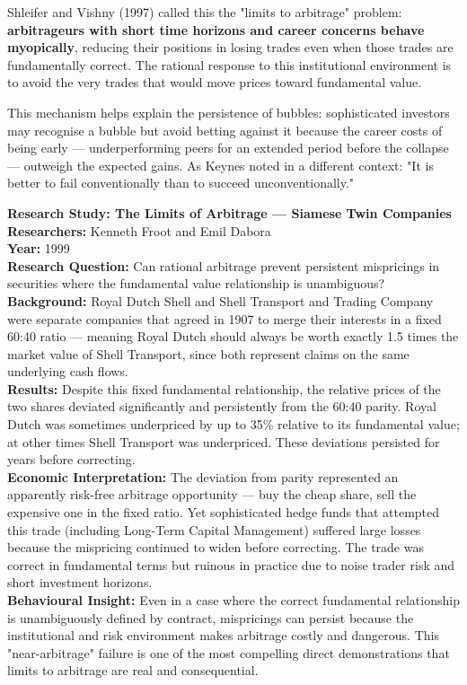 \documentclass[12pt, letterpaper]{article}
\begin{document}
Shleifer and Vishny (1997) called this the "limits to arbitrage" problem: \textbf{arbitrageurs with short time horizons and career concerns behave myopically}, reducing their positions in losing trades even when those trades are fundamentally correct. The rational response to this institutional environment is to avoid the very trades that would move prices toward fundamental value.

This mechanism helps explain the persistence of bubbles: sophisticated investors may recognise a bubble but avoid betting against it because the career costs of being early --- underperforming peers for an extended period before the collapse --- outweigh the expected gains. As Keynes noted in a different context: "It is better to fail conventionally than to succeed unconventionally."

\begin{researchbox}
\textbf{Research Study: The Limits of Arbitrage --- Siamese Twin Companies}\\[4pt]

\textbf{Researchers:} Kenneth Froot and Emil Dabora\\[4pt]
\textbf{Year:} 1999\\[4pt]
\textbf{Research Question:} Can rational arbitrage prevent persistent mispricings in securities where the fundamental value relationship is unambiguous?\\[4pt]
\textbf{Background:} Royal Dutch Shell and Shell Transport and Trading Company were separate companies that agreed in 1907 to merge their interests in a fixed 60:40 ratio --- meaning Royal Dutch should always be worth exactly 1.5 times the market value of Shell Transport, since both represent claims on the same underlying cash flows.\\[4pt]
\textbf{Results:} Despite this fixed fundamental relationship, the relative prices of the two shares deviated significantly and persistently from the 60:40 parity. Royal Dutch was sometimes underpriced by up to 35\% relative to its fundamental value; at other times Shell Transport was underpriced. These deviations persisted for years before correcting.\\[4pt]
\textbf{Economic Interpretation:} The deviation from parity represented an apparently risk-free arbitrage opportunity --- buy the cheap share, sell the expensive one in the fixed ratio. Yet sophisticated hedge funds that attempted this trade (including Long-Term Capital Management) suffered large losses because the mispricing continued to widen before correcting. The trade was correct in fundamental terms but ruinous in practice due to noise trader risk and short investment horizons.\\[4pt]
\textbf{Behavioural Insight:} Even in a case where the correct fundamental relationship is unambiguously defined by contract, mispricings can persist because the institutional and risk environment makes arbitrage costly and dangerous. This "near-arbitrage" failure is one of the most compelling direct demonstrations that limits to arbitrage are real and consequential.\\[4pt]
\end{researchbox}
\end{document}
